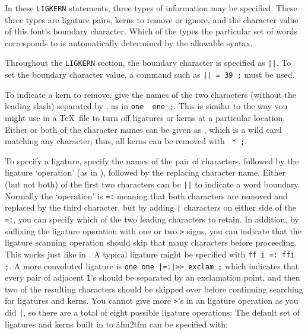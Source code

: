 In these {\tt LIGKERN} statements, three types of information may be
specified.  These three types are ligature pairs, kerns to remove or
ignore, and the character value of this font's boundary character.
Which of the types the particular set of words corresponds to is
automatically determined by the allowable syntax.

Throughout the {\tt LIGKERN} section, the boundary character is
specified as {\tt ||}.
To set the boundary character value, a command such as
{\tt || = 39 ;} must be used.

To indicate a kern to remove, give the names of the two characters
(without the leading slash) separated by {\tt {}}, as in
{\tt one \ one ;}.  This is similar to the way you
might use {\tt {}} in a \TeX\ file to turn off ligatures
or kerns at a particular location.  Either or both of the character
names can be given as {\tt *}, which is a wild card matching any
character; thus, all kerns can be removed with {\tt *
\ * ;}.

To specify a ligature, specify the names of the pair of characters,
followed by the ligature `operation' (as in \MF), followed by the
replacing character name.  Either (but not both) of the first two
characters can be {\tt ||} to indicate a word boundary.
Normally the `operation' is {\tt =:}
meaning that both characters are removed and replaced by the
third character, but by adding {\tt |} characters on either side of
the {\tt =:}, you can specify which of the two leading characters to
retain.  In addition, by suffixing the ligature operation with one
or two {\tt >} signs, you can indicate that the ligature scanning
operation should skip that many characters before proceeding.  This
works just like in \MF.  A typical ligature might be specified with
{\tt ff i =:{} ffi ;}.  A more convoluted ligature is
{\tt one one |=:|>> exclam ;} which indicates that every pair of
adjacent {\tt 1}'s should be separated by an exclamation point,
and then two of the resulting characters should be skipped over
before continuing searching for ligatures and kerns.  You cannot
give more {\tt >}'s in an ligature operation as you did {\tt |},
so there are a total of eight possible ligature operations:
\cmd{=: |=: |=:> =:| =:|> |=:| |=:|> |=:|>>}
\noindent
The default set of ligatures and kerns built in to \.{afm2tfm} can
be specified with:
{\vskip0pt\parskip=0pt
\endverb}

